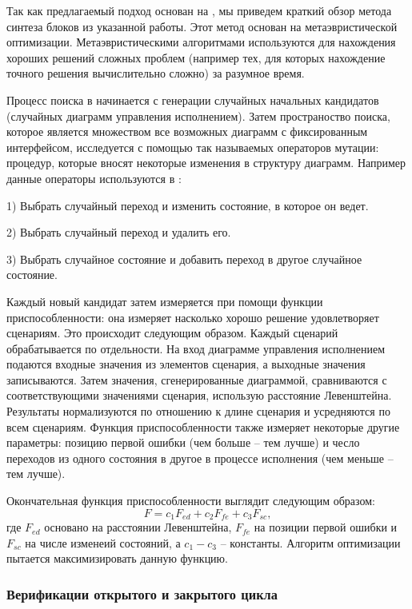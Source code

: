 \documentclass[14pt]{extarticle}
\theoremstyle{plain}
\theoremstyle{definition}
\begin{document}
Так как предлагаемый подход основан на \cite{rec}, мы приведем краткий обзор метода синтеза
блоков из указанной работы. Этот метод основан на метаэвристической
оптимизации. Метаэвристическими алгоритмами используются для нахождения хороших
решений сложных проблем (например тех, для которых нахождение точного решения
вычислительно сложно) за разумное время.

Процесс поиска в \cite{rec} начинается с генерации случайных начальных кандидатов
(случайных диаграмм управления исполнением). Затем пространоство поиска,
которое является множеством все возможных диаграмм с фиксированным интерфейсом,
исследуется с помощью так называемых операторов мутации: процедур, которые
вносят некоторые изменения в структуру диаграмм. Например данные операторы
используются в \cite{rec}:

1) Выбрать случайный переход и изменить состояние, в которое он ведет.

2) Выбрать случайный переход и удалить его.

3) Выбрать случайное состояние и добавить переход в другое случайное состояние.

Каждый новый кандидат затем измеряется при помощи функции приспособленности:
она измеряет насколько хорошо решение удовлетворяет сценариям. Это происходит
следующим образом. Каждый сценарий обрабатывается по отдельности. На вход
диаграмме управления исполнением подаются входные значения из элементов
сценария, а выходные значения записываются. Затем значения, сгенерированные
диаграммой, сравниваются с соответствующими значениями сценария, использую
расстояние Левенштейна. Результаты нормализуются по отношению к длине сценария
и усредняются по всем сценариям. Функция приспособленности также измеряет
некоторые другие параметры: позицию первой ошибки (чем больше -- тем лучше) и
чесло переходов из одного состояния в другое в процессе исполнения (чем меньше
-- тем лучше).

Окончательная функция приспособленности выглядит следующим образом:
$$
F = c_1 F_{ed} + c_2 F_{fe} + c_3 F_{sc},
$$
где $F_{ed}$ основано на расстоянии Левенштейна, $F_{fe}$ на позиции первой
ошибки и $F_{sc}$ на числе изменеий состояний, а $c_1 - c_3$ -- константы.
Алгоритм оптимизации пытается максимизировать данную функцию.

\subsubsection{Верификации открытого и закрытого цикла}
\end{document}
